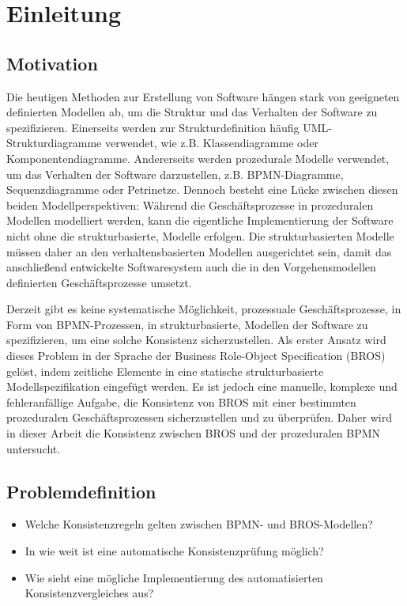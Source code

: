 \chapter{Einleitung}
\label{chap:introduction}

\section{Motivation}

Die heutigen Methoden zur Erstellung von Software hängen stark von geeigneten definierten Modellen ab, um die Struktur und das Verhalten der Software zu spezifizieren.
Einerseits werden zur Strukturdefinition häufig UML-Strukturdiagramme verwendet, wie z.B. Klassendiagramme oder Komponentendiagramme.
Andererseits werden prozedurale Modelle verwendet, um das Verhalten der Software darzustellen, z.B. BPMN-Diagramme, Sequenzdiagramme oder Petrinetze.
Dennoch besteht eine Lücke zwischen diesen beiden Modellperspektiven: Während die Geschäftsprozesse in prozeduralen Modellen modelliert werden, kann die eigentliche Implementierung der Software nicht ohne die strukturbasierte, Modelle erfolgen.
Die strukturbasierten Modelle müssen daher an den verhaltensbasierten Modellen ausgerichtet sein, damit das anschließend entwickelte Softwaresystem auch die in den Vorgehensmodellen definierten Geschäftsprozesse umsetzt.

Derzeit gibt es keine systematische Möglichkeit, prozessuale Geschäftsprozesse, in Form von BPMN-Prozessen, in strukturbasierte, Modellen der Software zu spezifizieren, um eine solche Konsistenz sicherzustellen.
Als erster Ansatz wird dieses Problem in der Sprache der Business Role-Object Specification (BROS) gelöst, indem zeitliche Elemente in eine statische strukturbasierte Modellspezifikation eingefügt werden.
Es ist jedoch eine manuelle, komplexe und fehleranfällige Aufgabe, die Konsistenz von BROS mit einer bestimmten prozeduralen Geschäftsprozessen sicherzustellen und zu überprüfen.
Daher wird in dieser Arbeit die Konsistenz zwischen BROS und der prozeduralen BPMN untersucht.

\section{Problemdefinition}

\begin{itemize}
    \item Welche Konsistenzregeln gelten zwischen BPMN- und BROS-Modellen?
    \item In wie weit ist eine automatische Konsistenzprüfung möglich?
    \item Wie sieht eine mögliche Implementierung des automatisierten Konsistenzvergleiches aus?
\end{itemize}

